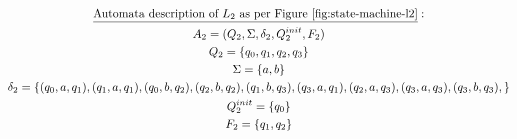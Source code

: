 \documentclass{article}
\begin{document}
\begin{enumerate}[(a)]
        \begin{equation*}
            \begin{gathered}
                \text{\underline{Automata description of $L_2$ as per Figure \ref{fig:state-machine-l2}}}: \\
                A_2 = (Q_2 , \Sigma , \delta_2 , Q_2^{init} , F_2) \\
                Q_2 = \{ q_0, q_1, q_2, q_3 \} \\
                \Sigma = \{ a, b \} \\
                \delta_2 = \{ (q_0, a, q_1),
                            (q_1, a, q_1), (q_0, b, q_2),(q_2, b, q_2),(q_1, b, q_3),(q_3, a, q_1),(q_2, a, q_3),(q_3,a, q_3),(q_3, b, q_3),
                \} \\
                Q_2^{init} = \{ q_0 \} \\
                F_2 = \{ q_1, q_2 \}
            \end{gathered}
        \end{equation*}
\end{enumerate}
\end{document}
